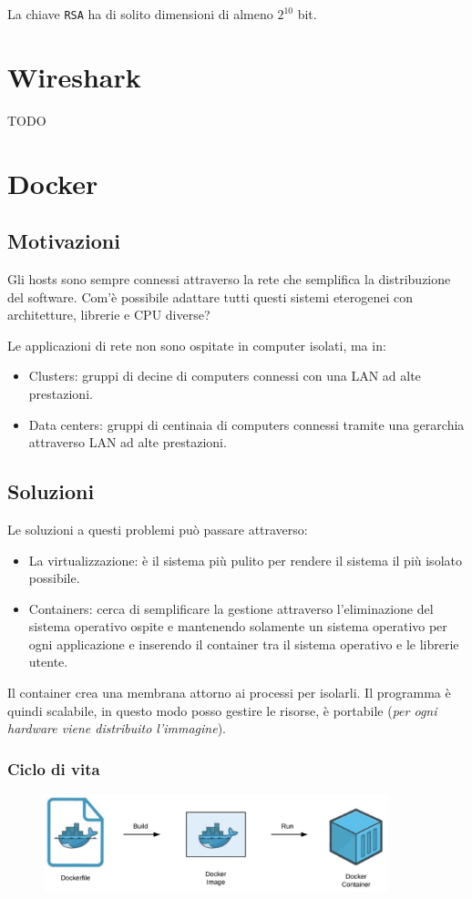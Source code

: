 \documentclass[oneside,a4paper,11pt]{book}
\theoremstyle{italicstyle}
\theoremstyle{normStyle}
\begin{document}
La chiave \verb|RSA| ha di solito dimensioni di almeno $2^{10}$ bit.














\chapter{Wireshark}
TODO
\chapter{Docker}
\section{Motivazioni}
Gli hosts sono sempre connessi attraverso la rete che semplifica la distribuzione 
del software. Com'è possibile adattare tutti questi sistemi eterogenei con architetture, 
librerie e CPU diverse?

Le applicazioni di rete non sono ospitate in computer isolati, ma in:
\begin{itemize}
  \item Clusters: gruppi di decine di computers connessi con una LAN ad alte prestazioni.
  \item Data centers: gruppi di centinaia di computers connessi tramite una gerarchia 
  attraverso LAN ad alte prestazioni.
\end{itemize}
\section{Soluzioni}
Le soluzioni a questi problemi può passare attraverso:
\begin{itemize}
  \item La virtualizzazione: è il sistema più pulito per rendere il sistema il più 
  isolato possibile.
  \item Containers: cerca di semplificare la gestione attraverso l'eliminazione del sistema operativo 
  ospite e mantenendo solamente un sistema operativo per ogni applicazione e inserendo il container tra 
  il sistema operativo e le librerie utente.
\end{itemize}
Il container crea una membrana attorno ai processi per isolarli. Il programma è quindi 
scalabile, in questo modo posso gestire le risorse, è portabile (\textit{per ogni hardware viene 
distribuito l'immagine}).
\subsection{Ciclo di vita }
\begin{figure}[H]
  \centering
  \includegraphics[width=10cm]{src/docker_img.png}
\end{figure}
\end{document}

